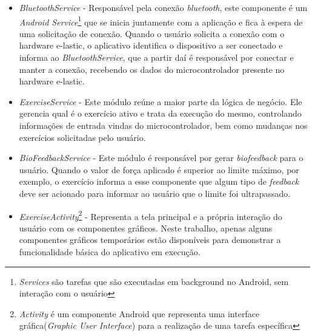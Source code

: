 \begin{itemize}
	\item \textit{BluetoothService} - Responsável pela conexão \textit{bluetooth}, este componente é um \textit{Android Service}\footnote{\textit{Services} são tarefas que são executadas em background no Android, sem interação com o usuário} que se inicia juntamente com a aplicação e fica à espera de uma solicitação de conexão. Quando o usuário solicita a conexão com o hardware e-lastic, o aplicativo identifica o dispositivo a ser conectado e informa ao \textit{BluetoothService}, que a partir daí é responsável por conectar e manter a conexão, recebendo os dados do microcontrolador presente no hardware e-lastic.
	\item \textit{ExerciseService} - Este módulo reúne a maior parte da lógica de negócio. Ele gerencia qual é o exercício ativo e trata da execução do mesmo, controlando informações de entrada vindas do microcontrolador, bem como mudanças nos exercícios solicitadas pelo usuário.
	\item \textit{BioFeedbackService} - Este módulo é responsável por gerar \textit{biofeedback} para o usuário. Quando o valor de força aplicado é superior ao limite máximo, por exemplo, o exercício informa a esse componente que algum tipo de \textit{feedback} deve ser acionado para informar ao usuário que o limite foi ultrapassado.
	\item \textit{ExerciseActivity}\footnote{\textit{Activity} é um componente Android que representa uma interface gráfica(\textit{Graphic User Interface}) para a realização de uma tarefa específica} - Representa a tela principal e a própria interação do usuário com os componentes gráficos. Neste trabalho, apenas alguns componentes gráficos temporários estão disponíveis para demonstrar a funcionalidade básica do aplicativo em execução.
\end{itemize} 

